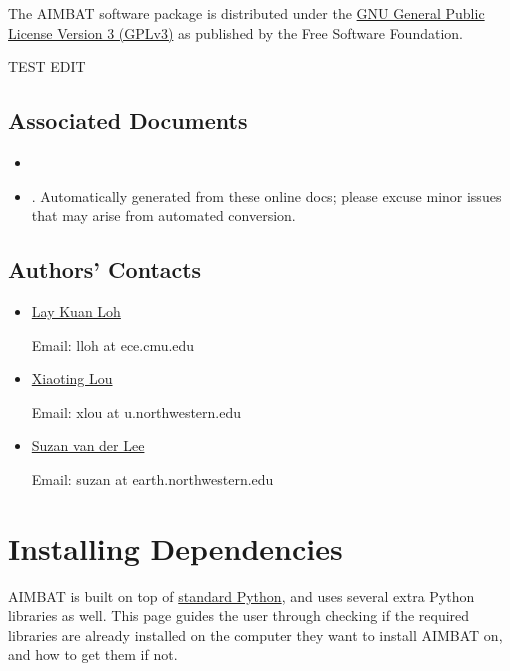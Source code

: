 \documentclass[letterpaper,10pt,english]{sphinxmanual}
\begin{document}
The AIMBAT software package is distributed under the \href{http://www.gnu.org/licenses/gpl.html}{GNU General Public License Version 3 (GPLv3)} as published by the Free Software Foundation.

TEST EDIT


\section{Associated Documents}
\label{docfiles/introduction:associated-documents}\begin{itemize}
\item {} 

\item {} 
. Automatically generated from these online docs; please excuse minor issues that may arise from automated conversion.

\end{itemize}


\section{Authors' Contacts}
\label{docfiles/introduction:authors-contacts}\label{docfiles/introduction:id5}\begin{itemize}
\item {} 
\href{http://lkloh2410.wordpress.com/}{Lay Kuan Loh}

Email: lloh at ece.cmu.edu

\item {} 
\href{http://www.earth.northwestern.edu/~xlou/Welcome.html}{Xiaoting Lou}

Email: xlou at u.northwestern.edu

\item {} 
\href{http://www.earth.northwestern.edu/research/suzan/}{Suzan van der Lee}

Email: suzan at earth.northwestern.edu

\end{itemize}


\chapter{Installing Dependencies}
\label{docfiles/install_dependencies:installing-dependencies}\label{docfiles/install_dependencies::doc}
AIMBAT is built on top of \href{https://www.python.org/}{standard Python}, and uses several extra Python libraries as well. This page guides the user through checking if the required libraries are already installed on the computer they want to install AIMBAT on, and how to get them if not.
\end{document}

